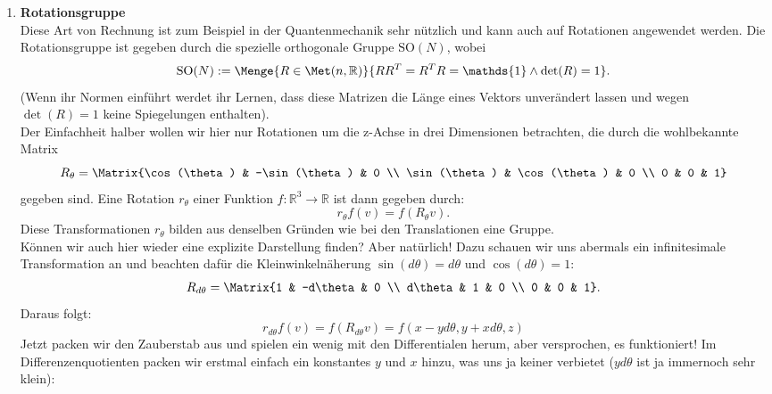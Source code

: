 \begin{Beispiel}
\begin{enumerate}
\item \textbf{Rotationsgruppe} \\
Diese Art von Rechnung ist zum Beispiel in der Quantenmechanik sehr nützlich und kann auch auf Rotationen angewendet werden. Die Rotationsgruppe ist gegeben durch die spezielle orthogonale Gruppe $\text{SO}(N)$, wobei 
\begin{equation*}
    \text{SO}(N) := \Menge{R \in \Met(n,\mathbb{R})}{RR^{T}=R^{T}R=\mathds{1} \land \det(R) = 1}.
\end{equation*}
(Wenn ihr Normen einführt werdet ihr Lernen, dass diese Matrizen die Länge eines Vektors unverändert lassen und wegen $\det(R)=1$ keine Spiegelungen enthalten). \\
Der Einfachheit halber wollen wir hier nur Rotationen um die z-Achse in drei Dimensionen betrachten, die durch die wohlbekannte Matrix
\begin{equation*}
    R_{\theta} = \Matrix{\cos(\theta) & -\sin(\theta) & 0 \\ \sin(\theta) & \cos(\theta) & 0 \\ 0 & 0 & 1}
\end{equation*}
gegeben sind. Eine Rotation $r_{\theta}$ einer Funktion $f:\mathbb{R}^{3} \rightarrow \mathbb{R}$ ist dann gegeben durch:
\begin{equation*}
    r_{\theta}f(v) = f(R_{\theta} v).
\end{equation*}
Diese Transformationen $r_{\theta}$ bilden aus denselben Gründen wie bei den Translationen eine Gruppe. \\
Können wir auch hier wieder eine explizite Darstellung finden? Aber natürlich! Dazu schauen wir uns abermals ein infinitesimale Transformation an und beachten dafür die Kleinwinkelnäherung $\sin(d\theta)=d\theta$ und $\cos(d\theta)=1$:
\begin{equation*}
    R_{d\theta}=\Matrix{1 & -d\theta & 0 \\ d\theta & 1 & 0 \\ 0 & 0 & 1}.
\end{equation*}
Daraus folgt:
\begin{equation*}
    r_{d\theta}f(v) = f(R_{d\theta}v) = f(x-yd\theta, y+xd\theta, z)
\end{equation*}
Jetzt packen wir den Zauberstab aus und spielen ein wenig mit den Differentialen herum, aber versprochen, es funktioniert! Im Differenzenquotienten packen wir erstmal einfach ein konstantes $y$ und $x$ hinzu, was uns ja keiner verbietet ($yd\theta$ ist ja immernoch sehr klein):
\begin{align*}

\end{align*}
\end{enumerate}
\end{Beispiel}
